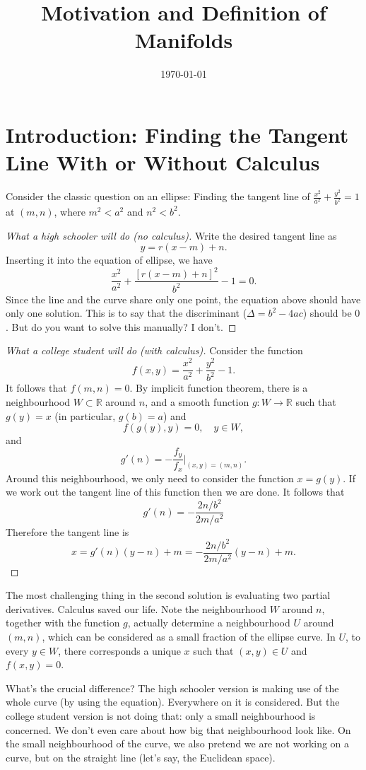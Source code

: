 \documentclass[twoside]{article}
\title{Motivation and Definition of Manifolds}
\date{\today}
\begin{document}
	\maketitle
	\section{Introduction: Finding the Tangent Line With or Without Calculus}
		Consider the classic question on an ellipse: Finding the tangent line of $\frac{x^2}{a^2}+\frac{y^2}{b^2}=1$ at $(m,n)$, where $m^2< a^2$ and $n^2 < b^2$. 
		\begin{proof}[What a high schooler will do (no calculus)]
			Write the desired tangent line as
			\[
				y=r(x-m)+n.
			\]
			Inserting it into the equation of ellipse, we have
			\[
				\frac{x^2}{a^2}+\frac{[r(x-m)+n]^2}{b^2}-1=0.
			\]
			Since the line and the curve share only one point, the equation above should have only one solution. This is to say that the discriminant ($\Delta = b^2-4ac$) should be $0$. But do you want to solve this manually? I don't. 
		\end{proof}
		\begin{proof}[What a college student will do (with calculus)]
			Consider the function
			\[
				f(x,y)=\frac{x^2}{a^2}+\frac{y^2}{b^2}-1.
			\]
			It follows that $f(m,n)=0$. By implicit function theorem, there is a neighbourhood $W \subset \mathbb{R}$ around $n$, and a smooth function $g:W \to \mathbb{R}$ such that $g(y)=x$ (in particular, $g(b)=a$) and
			\[
				f(g(y),y)=0, \quad y \in W,
			\]
			and 
			\[
				g'(n) = -\frac{f_y}{f_x}\vert_{(x,y)=(m,n)}.
			\]
			Around this neighbourhood, we only need to consider the function $x=g(y)$. If we work out the tangent line of this function then we are done. It follows that
			\[
				g'(n) = -\frac{2n/b^2}{2m/a^2}
			\]
			Therefore the tangent line is
			\[
				x=g'(n)(y-n)+m = -\frac{2n/b^2}{2m/a^2}(y-n)+m.
			\]
		\end{proof}
		The most challenging thing in the second solution is evaluating two partial derivatives. Calculus saved our life. Note the neighbourhood $W$ around $n$, together with the function $g$, actually determine a neighbourhood $U$ around $(m,n)$, which can be considered as a small fraction of the ellipse curve. In $U$, to every $y \in W$, there corresponds a unique $x$ such that $(x,y) \in U$ and $f(x,y)=0$.
		
		What's the crucial difference? The high schooler version is making use of the whole curve (by using the equation). Everywhere on it is considered. But the college student version is not doing that: only a small neighbourhood is concerned. We don't even care about how big that neighbourhood look like. On the small neighbourhood of the curve, we also pretend we are not working on a curve, but on the straight line (let's say, the Euclidean space).
		
\end{document}
